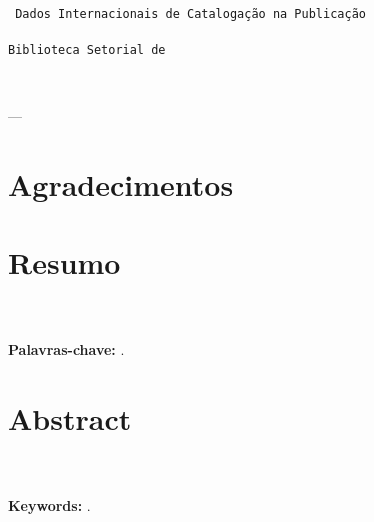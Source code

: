 \rec 
\vspace{180mm}
\\
\texttt{
	Dados Internacionais de Catalogação na Publicação \\
	\universidade \\
	Biblioteca Setorial de \curso
}

\newpage

\rec \\
\vspace{120mm}
\begin{flushright}
	\begin{minipage}{70mm}
		\asp{\emph{\citacao}}
		\begin{flushright}
			--- \autorcitacao
		\end{flushright}
	\end{minipage}
\end{flushright}

\chapter{Agradecimentos}
	
	\agradecimentos

\chapter{Resumo}
	\resumo \\
	\\
	\rec \textbf{Palavras-chave:} \palavraschave.
%

\newpage

\chapter{Abstract}

	\abstract \\
	\\
	\rec \textbf{Keywords:} \keywords.
%